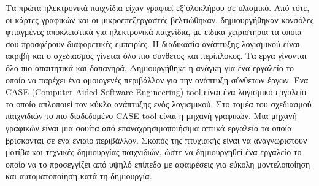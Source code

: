 \documentclass[oneside, 12pt]{book}
\begin{document}
	
	\Titlepage
	\Declarationpage
	
	\begin{Abstract}
		Τα πρώτα ηλεκτρονικά παιχνίδια είχαν γραφτεί εξ'ολοκλήρου σε υλισμικό. Από τότε, οι κάρτες γραφικών και οι μικροεπεξεργαστές βελτιώθηκαν, δημιουργήθηκαν κονσόλες φτιαγμένες αποκλειστικά για ηλεκτρονικά παιχνίδια, με ειδικά χειριστήρια τα οποία σου προσφέρουν διαφορετικές εμπειρίες.
		Η διαδικασία ανάπτυξης λογισμικού είναι ακριβή και ο σχεδιασμός γίνεται όλο πιο σύνθετος και περίπλοκος. Τα έργα γίνονται όλο πιο απαιτητικά και δαπανηρά. Δημιουργήθηκε η ανάγκη για ένα εργαλείο το οποίο να παρέχει ένα ομοιογενές περιβάλλον για την ανάπτυξη σύνθετων έργων. 
		Ένα CASE (Computer Aided Software Engineering) tool είναι ένα λογισμικό-εργαλείο το οποίο απλοποιεί τον κύκλο ανάπτυξης ενός λογισμικού. 
		Στο τομέα του σχεδιασμού παιχνιδιών το πιο διαδεδομένο CASE tool είναι η μηχανή γραφικών. Μια μηχανή γραφικών είναι μια σουίτα από επαναχρησιμοποιήσιμα οπτικά εργαλεία τα οποία βρίσκονται σε ένα ενιαίο περιβάλλον.
		Σκοπός της πτυχιακής είναι να αναγνωριστούν μοτίβα και τεχνικές δημιουργίας παιχνιδιών, ώστε να δημιουργηθεί ένα εργαλείο το οποίο να το προσεγγίζει από υψηλό επίπεδο με αφαιρέσεις για εύκολη μοντελοποίηση και αυτοματοποίηση κατά τη δημιουργία.
	\end{Abstract}
	\tableofcontents
	\listoftables
	\listoffigures
	
\end{document}
